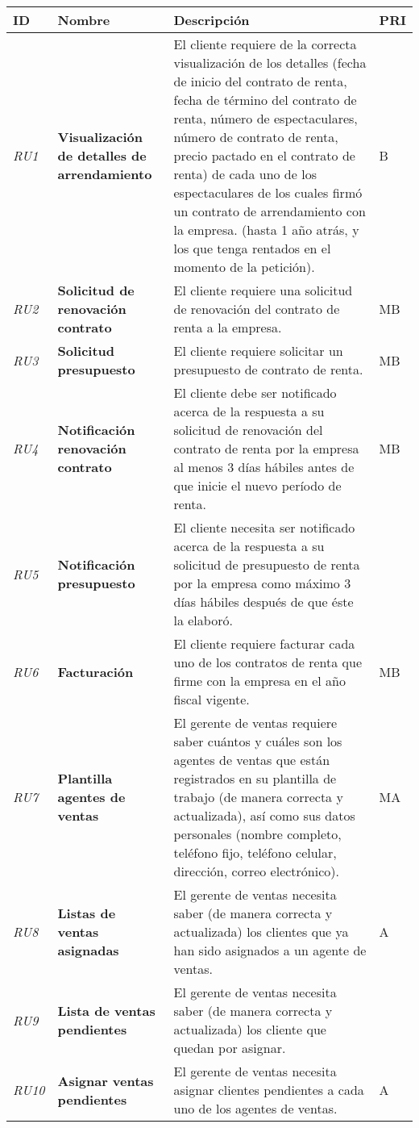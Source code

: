 \begin{longtable}[H]{m{1cm}m{3cm}m{10cm}m{1cm}}
\toprule
\centering \textbf{ID} & \centering  \textbf{Nombre} & \centering \textbf{Descripción} & \centering \textbf{PRI} \tabularnewline
\midrule
\textit{RU1} &\textbf{Visualización de detalles de arrendamiento} & El cliente requiere de la correcta visualización de los detalles (fecha de inicio del contrato de renta, fecha de término del contrato de renta, número de espectaculares, número de contrato de renta, precio pactado en el contrato de renta) de cada uno de los espectaculares  de los cuales firmó un contrato de arrendamiento con la empresa. (hasta 1 año atrás, y los que  tenga rentados en el momento de la petición). & B\tabularnewline
\textit{RU2} &\textbf{Solicitud de renovación contrato} & El cliente requiere una solicitud de renovación del contrato de renta a la empresa. & MB\tabularnewline
\textit{RU3} &\textbf{Solicitud presupuesto} & El cliente requiere solicitar un presupuesto de contrato de renta. & MB\tabularnewline
\textit{RU4} &\textbf{Notificación renovación contrato} & El cliente debe ser notificado acerca de la respuesta a su solicitud de renovación del contrato de renta por la empresa al menos 3 días hábiles antes de  que inicie el nuevo período de renta. & MB\tabularnewline
\textit{RU5} &\textbf{Notificación presupuesto} & El cliente necesita ser notificado acerca de la respuesta  a su solicitud de presupuesto de renta por la empresa como máximo 3 días hábiles después de que éste la elaboró. &\tabularnewline
\textit{RU6} &\textbf{Facturación} & El cliente requiere facturar cada uno de los contratos de renta que firme con la empresa en el año fiscal vigente. & MB\tabularnewline
\textit{RU7} &\textbf{Plantilla agentes de ventas} & El gerente de ventas requiere saber cuántos y cuáles son los agentes de ventas que están registrados en su plantilla de trabajo (de manera correcta y actualizada), así como sus datos personales (nombre completo, teléfono fijo, teléfono celular, dirección, correo electrónico). & MA\tabularnewline
\textit{RU8} &\textbf{Listas de ventas asignadas} & El gerente de ventas necesita saber (de manera correcta y actualizada) los clientes que ya han sido asignados a un agente de ventas. & A\tabularnewline
\textit{RU9} &\textbf{Lista de ventas pendientes} & El gerente de ventas necesita saber (de manera correcta y actualizada) los cliente que quedan por asignar. &\tabularnewline
\textit{RU10} &\textbf{Asignar ventas pendientes} & El gerente de ventas necesita asignar clientes pendientes a cada uno de los agentes de ventas. & A\tabularnewline

\end{longtable}
